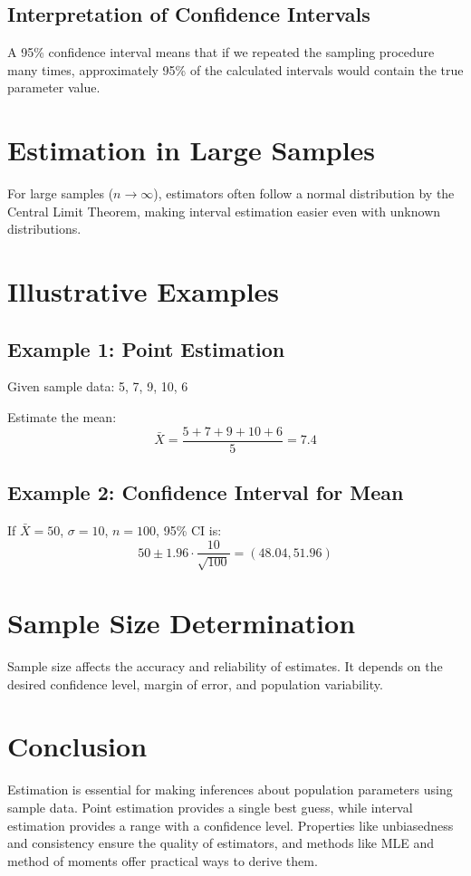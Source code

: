 \documentclass[twoside]{book}
\begin{document}
\subsection{Interpretation of Confidence Intervals}
A 95\% confidence interval means that if we repeated the sampling procedure many times, approximately 95\% of the calculated intervals would contain the true parameter value.

\section{Estimation in Large Samples}
For large samples (\( n \to \infty \)), estimators often follow a normal distribution by the Central Limit Theorem, making interval estimation easier even with unknown distributions.

\section{Illustrative Examples}
\subsection*{Example 1: Point Estimation}
Given sample data: 5, 7, 9, 10, 6

Estimate the mean:
\[
\bar{X} = \frac{5 + 7 + 9 + 10 + 6}{5} = 7.4
\]

\subsection*{Example 2: Confidence Interval for Mean}
If \( \bar{X} = 50 \), \( \sigma = 10 \), \( n = 100 \), 95\% CI is:
\[
50 \pm 1.96 \cdot \frac{10}{\sqrt{100}} = (48.04, 51.96)
\]


\section{Sample Size Determination}
Sample size affects the accuracy and reliability of estimates. It depends on the desired confidence level, margin of error, and population variability.



\section{Conclusion}
Estimation is essential for making inferences about population parameters using sample data. Point estimation provides a single best guess, while interval estimation provides a range with a confidence level. Properties like unbiasedness and consistency ensure the quality of estimators, and methods like MLE and method of moments offer practical ways to derive them.
\end{document}
